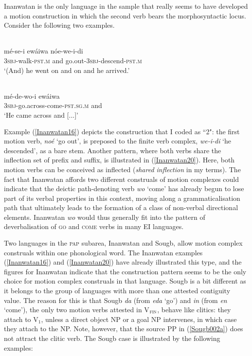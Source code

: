 Inanwatan is the only language in the sample that really seems to have developed a motion construction in which the second verb bears the morphosyntactic locus. Consider the following two examples.

\ea \label{Inanwatan16}
\\
\gll mé-se-i ewáiwa nóe-we-i-di \\
\textsc{3}\textsc{sbj}-walk-\textsc{pst}.\textsc{m} and go.out-\textsc{3}\textsc{sbj}-descend-\textsc{pst}.\textsc{m} \\
\glft `(And) he went on and on and he arrived.'\\ 
\z

\ea \label{Inanwatan20}
\\
\gll mé-de-wo-i ewáiwa \\
\textsc{3}\textsc{sbj}-go.across-come-\textsc{pst}.\textsc{sg}.\textsc{m} and \\
\glft `He came across and [...]'\\ 
\z

Example (\ref{Inanwatan16}) depicts the construction that I coded as ``2": the first motion verb, \textit{noé} `go out', is preposed to the finite verb complex, \textit{we-i-di} `he descended', as a bare stem. Another pattern, where both verbs share the inflection set of prefix and suffix, is illustrated in (\ref{Inanwatan20}). Here, both motion verbs can be conceived as inflected (\textit{shared inflection }in my terms). The fact that Inanwatan affords two different construals of motion complexes could indicate that the deictic path-denoting verb \textit{wo} `come' has already begun to lose part of its verbal properties in this context, moving along a grammaticalisation path that ultimately leads to the formation of a class of non-verbal directional elements. Inanwatan \textit{wo} would thus generally fit into the pattern of deverbalisation of \textsc{go} and \textsc{come} verbs in many EI languages.

Two languages in the \textsc{pap} subarea, Inanwatan and Sougb, allow motion complex construals within one phonological word. The Inanwatan examples (\ref{Inanwatan16}) and (\ref{Inanwatan20}) have already illustrated this type, and the figures for Inanwatan indicate that the construction pattern seems to be the only choice for motion complex construals in that language. Sougb is a bit different as it belongs to the group of languages with more than one attested contiguity value. The reason for this is that Sougb \textit{da} (from \textit{eda} `go') and \textit{in} (from \textit{en} `come'), the only two motion verbs attested in V$_{\textsc{fin}}$, behave like clitics: they attach to V$_{1}$, unless a direct object NP or a goal NP intervenes, in which case they attach to the NP. Note, however, that the source PP in (\ref{Sougb002a}) does not attract the clitic verb. The Sougb case is illustrated by the following examples:

